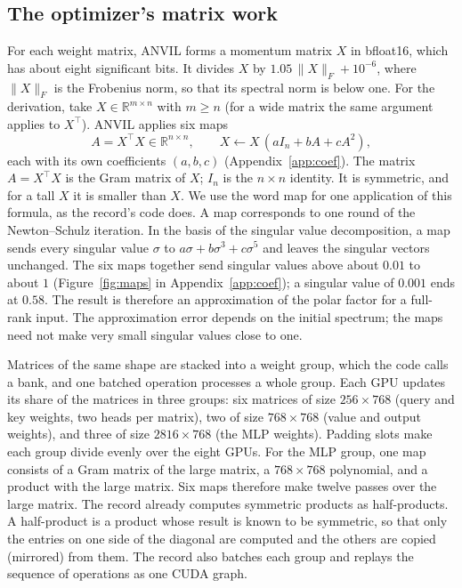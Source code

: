 \documentclass{article}
\begin{document}
\subsection{The optimizer's matrix work}
For each weight matrix, ANVIL forms a momentum matrix $X$ in bfloat16, which has about eight significant bits. It divides $X$ by $1.05\,\|X\|_F+10^{-6}$, where $\|X\|_F$ is the Frobenius norm, so that its spectral norm is below one. For the derivation, take $X\in\mathbb{R}^{m\times n}$ with $m\geq n$ (for a wide matrix the same argument applies to $X^\top$). ANVIL applies six maps
\begin{equation}
A = X^\top X\in\mathbb{R}^{n\times n},\qquad X \leftarrow X\,(aI_n + bA + cA^2),
\end{equation}
each with its own coefficients $(a,b,c)$ (Appendix~\ref{app:coef}). The matrix $A=X^\top X$ is the Gram matrix of $X$; $I_n$ is the $n\times n$ identity. It is symmetric, and for a tall $X$ it is smaller than $X$. We use the word map for one application of this formula, as the record's code does. A map corresponds to one round of the Newton--Schulz iteration. In the basis of the singular value decomposition, a map sends every singular value $\sigma$ to $a\sigma+b\sigma^3+c\sigma^5$ and leaves the singular vectors unchanged. The six maps together send singular values above about $0.01$ to about $1$ (Figure~\ref{fig:maps} in Appendix~\ref{app:coef}); a singular value of $0.001$ ends at $0.58$. The result is therefore an approximation of the polar factor for a full-rank input. The approximation error depends on the initial spectrum; the maps need not make very small singular values close to one.





Matrices of the same shape are stacked into a weight group, which the code calls a bank, and one batched operation processes a whole group. Each GPU updates its share of the matrices in three groups: six matrices of size $256\times768$ (query and key weights, two heads per matrix), two of size $768\times768$ (value and output weights), and three of size $2816\times768$ (the MLP weights). Padding slots make each group divide evenly over the eight GPUs. For the MLP group, one map consists of a Gram matrix of the large matrix, a $768\times768$ polynomial, and a product with the large matrix. Six maps therefore make twelve passes over the large matrix. The record already computes symmetric products as half-products. A half-product is a product whose result is known to be symmetric, so that only the entries on one side of the diagonal are computed and the others are copied (mirrored) from them. The record also batches each group and replays the sequence of operations as one CUDA graph.
\end{document}
